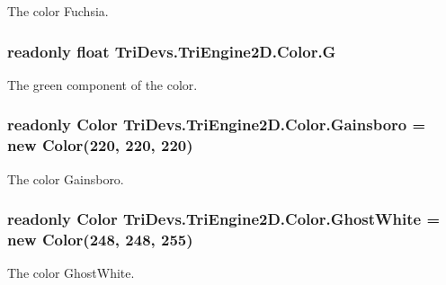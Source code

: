 The color Fuchsia. 

\hypertarget{struct_tri_devs_1_1_tri_engine2_d_1_1_color_af8dd846268b6f84ba3f0ac0c8d26aa61}{
\subsubsection[{G}]{\setlength{\rightskip}{0pt plus 5cm}readonly float Tri\-Devs.\-Tri\-Engine2\-D.\-Color.\-G}}\label{struct_tri_devs_1_1_tri_engine2_d_1_1_color_af8dd846268b6f84ba3f0ac0c8d26aa61}


The green component of the color. 

\hypertarget{struct_tri_devs_1_1_tri_engine2_d_1_1_color_a06b361380cf8a0503f99b63ad1fcb3ee}{
\subsubsection[{Gainsboro}]{\setlength{\rightskip}{0pt plus 5cm}readonly {\bf Color} Tri\-Devs.\-Tri\-Engine2\-D.\-Color.\-Gainsboro = new {\bf Color}(220, 220, 220)\hspace{0.3cm}{\ttfamily [static]}}}\label{struct_tri_devs_1_1_tri_engine2_d_1_1_color_a06b361380cf8a0503f99b63ad1fcb3ee}


The color Gainsboro. 

\hypertarget{struct_tri_devs_1_1_tri_engine2_d_1_1_color_a7621c27221a8b6c8870ec5112a28a3e6}{
\subsubsection[{Ghost\-White}]{\setlength{\rightskip}{0pt plus 5cm}readonly {\bf Color} Tri\-Devs.\-Tri\-Engine2\-D.\-Color.\-Ghost\-White = new {\bf Color}(248, 248, 255)\hspace{0.3cm}{\ttfamily [static]}}}\label{struct_tri_devs_1_1_tri_engine2_d_1_1_color_a7621c27221a8b6c8870ec5112a28a3e6}


The color Ghost\-White. 

